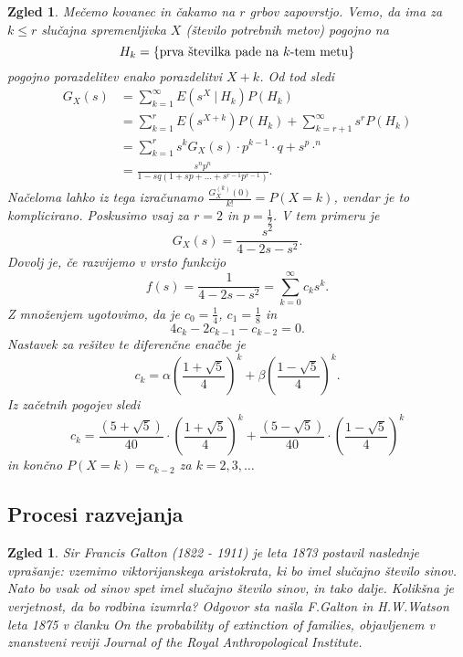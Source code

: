 \documentclass[10pt, a4paper]{article}
\newtheorem{zgled}[izr]{Zgled}
\begin{document}
\begin{zgled}
  Mečemo kovanec in čakamo na $r$ grbov zapovrstjo.
  Vemo, da ima za $k \leq r$ slučajna spremenljivka $X$ (število potrebnih metov)
  pogojno na $$H_k = \{\textup{prva številka pade na $k$-tem metu}\}$$
  pogojno porazdelitev enako porazdelitvi $X + k$.
  Od tod sledi 
  \begin{align*}
    G_X (s) &= \sum_{k = 1} ^\infty E(s^X\ |\ H_k) P(H_k)\\
    &= \sum_{k = 1} ^r E(s^{X + k}) P(H_k) + \sum_{k = r + 1} ^\infty s^r P(H_k)\\
    &=\sum_{k = 1} ^r s^k G_X (s) \cdot p^{k - 1} \cdot q + s^p \cdotp^n\\
    &= \frac{s^n p^n}{1 - sq(1 + sp + \dots + s^{r - 1} p^{r - 1})}.
  \end{align*}
  Načeloma lahko iz tega izračunamo $\frac{G_X ^{(k)} (0)}{k!} = P(X = k)$,
  vendar je to komplicirano. Poskusimo vsaj za $r = 2$ in $p = \frac{1}{2}$.
  V tem primeru je $$G_X (s) = \frac{s^2}{4 - 2s - s^2}.$$
  Dovolj je, če razvijemo v vrsto funkcijo 
  $$f(s) = \frac{1}{4 - 2s - s^2} = \sum_{k = 0} ^\infty c_k s^k.$$
  Z množenjem ugotovimo, da je $c_0 = \frac{1}{4}$, $c_1 = \frac{1}{8}$ in 
  $$4c_k - 2 c_{k - 1} - c_{k - 2} = 0.$$
  Nastavek za rešitev te diferenčne enačbe je 
  $$c_k = \alpha \left(\frac{1 + \sqrt{5}}{4}\right)^k + \beta \left(\frac{1 - \sqrt{5}}{4}\right)^k.$$
  Iz začetnih pogojev sledi 
  $$c_k = \frac{(5 + \sqrt{5})}{40} \cdot \left(\frac{1 + \sqrt{5}}{4}\right)^k + \frac{(5 - \sqrt{5})}{40} \cdot \left(\frac{1 - \sqrt{5}}{4}\right)^k$$
  in končno $P(X = k) = c_{k - 2}$ za $k = 2, 3, \dots$
\end{zgled}

\subsection{Procesi razvejanja}

\begin{zgled}
  Sir Francis Galton (1822 - 1911) je leta 1873 postavil naslednje vprašanje: vzemimo viktorijanskega aristokrata,
  ki bo imel slučajno število sinov. Nato bo vsak od sinov spet imel slučajno število sinov, in tako dalje.
  Kolikšna je verjetnost, da bo rodbina izumrla? Odgovor sta našla F.Galton in H.W.Watson leta 1875 v članku 
  On the probability of extinction of families, objavljenem v znanstveni reviji
  Journal of the Royal Anthropological Institute.
\end{zgled}
\end{document}
